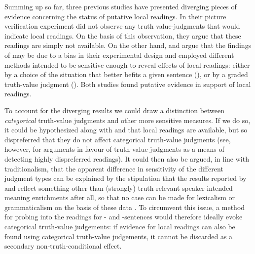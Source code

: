 \documentclass[fleqn,reqno,10pt,draft]{article}
\newcommand{\as}{\acro{as}}
\renewcommand{\es}{\acro{es}}
\begin{document}
Summing up so far, three previous studies have presented diverging
pieces of evidence concerning the status of putative local
readings. In their picture verification experiment
\citet{GeurtsPouscoulous2009:Embedded-Implic} did not observe any
truth value-judgments that would indicate local readings. On the basis
of this observation, they argue that these readings are simply not
available. On the other hand,
\citeauthor{CliftonDube2010:Embedded-Implic} and
\citeauthor{ChemlaSpector2010:Experimental-Ev} argue that the findings
of \citeauthor{GeurtsPouscoulous2009:Embedded-Implic} may be due to a
bias in their experimental design and employed different methods
intended to be sensitive enough to reveal effects of local readings:
either by a choice of the situation that better befits a given
sentence (\citeauthor{CliftonDube2010:Embedded-Implic}), or by a
graded truth-value judgment
(\citeauthor{ChemlaSpector2010:Experimental-Ev}). Both studies found
putative evidence in support of local readings.

To account for the diverging results we could draw a distinction
between \emph{categorical} truth-value judgments and other more
sensitive measures. If we do so, it could be hypothesized along with
\citeauthor{CliftonDube2010:Embedded-Implic} and
\citeauthor{ChemlaSpector2010:Experimental-Ev} that local readings are
available, but so dispreferred that they do not affect categorical
truth-value judgments (see, however, \citet{Crain1998} for arguments
in favour of truth-value judgments as a means of detecting highly
dispreferred readings).  It could then also be argued, in line with
traditionalism, that the apparent difference in sensitivity of the
different judgment types can be explained by the stipulation that the
results reported by \citeauthor{CliftonDube2010:Embedded-Implic} and
\citeauthor{ChemlaSpector2010:Experimental-Ev} reflect something other
than (strongly) truth-relevant speaker-intended meaning enrichments
after all, so that no case can be made for lexicalism or
grammaticalism on the basis of these data \citep[c.f.][for arguments
along these
lines]{Tielvan-Tiel2012:Embedded-Scalar,GeurtsTielvan-Tiel2013:Scalar-expressi}. To
circumvent this issue, a method for probing into the readings
for \as- and \es-sentences would therefore ideally evoke categorical
truth-value judgements: if evidence for local readings can also be
found using categorical truth-value judgements, it cannot be discarded
as a secondary non-truth-conditional effect.
\end{document}
